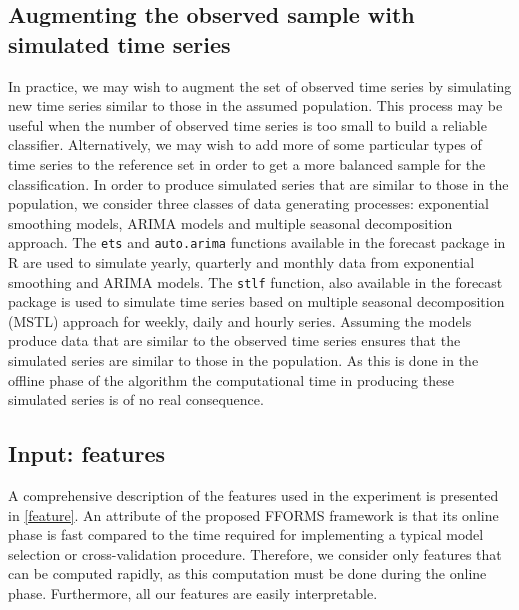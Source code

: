 \documentclass[11pt,a4paper,]{article}
\begin{document}
\hypertarget{simulatingseries}{%
\subsection{Augmenting the observed sample with simulated time series}\label{simulatingseries}}

In practice, we may wish to augment the set of observed time series by simulating new time series similar to those in the assumed population. This process may be useful when the number of observed time series is too small to build a reliable classifier. Alternatively, we may wish to add more of some particular types of time series to the reference set in order to get a more balanced sample for the classification. In order to produce simulated series that are similar to those in the population, we consider three classes of data generating processes: exponential smoothing models, ARIMA models and multiple seasonal decomposition approach. The \texttt{ets} and \texttt{auto.arima} functions available in the forecast package in R \autocite{forecast} are used to simulate yearly, quarterly and monthly data from exponential smoothing and ARIMA models. The \texttt{stlf} function, also available in the forecast package is used to simulate time series based on multiple seasonal decomposition (MSTL) approach for weekly, daily and hourly series. Assuming the models produce data that are similar to the observed time series ensures that the simulated series are similar to those in the population. As this is done in the offline phase of the algorithm the computational time in producing these simulated series is of no real consequence.

\hypertarget{input-features}{%
\subsection{Input: features}\label{input-features}}

A comprehensive description of the features used in the experiment is presented in \autoref{feature}. An attribute of the proposed FFORMS framework is that its online phase is fast compared to the time required for implementing a typical model selection or cross-validation procedure. Therefore, we consider only features that can be computed rapidly, as this computation must be done during the online phase. Furthermore, all our features are easily interpretable.
\end{document}
